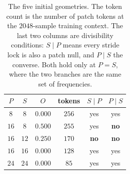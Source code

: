 \begin{table}[!b]
    \centering
    \small
    \begin{tabular}{@{}cccccc@{}}
        \toprule
        $P$ & $S$ & $O$ & \textbf{tokens} & $S \mid P$ & $P \mid S$ \\
        \midrule
        $8$ & $8$ & $0.000$ & $256$ & yes & yes \\
        \midrule
        $16$ & $8$ & $0.500$ & $255$ & yes & \textbf{no} \\
        $16$ & $12$ & $0.250$ & $170$ & \textbf{no} & \textbf{no} \\
        $16$ & $16$ & $0.000$ & $128$ & yes & yes \\
        \midrule
        $24$ & $24$ & $0.000$ & $85$ & yes & yes \\
        \bottomrule
    \end{tabular}
    \caption{The five initial geometries. The token count is the number of patch tokens at the $2048$-sample training context. The last two columns are divisibility conditions: $S \mid P$ means every stride lock is also a patch null, and $P \mid S$ the converse. Both hold only at $P=S$, where the two branches are the same set of frequencies.}
    \label{tab:patchStride}
\end{table}
